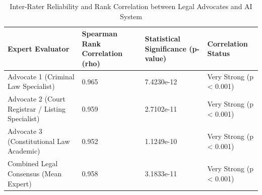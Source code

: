 \begin{table}
\caption{Inter-Rater Reliability and Rank Correlation between Legal Advocates and AI System}
\label{tab:expert_agreement}
\begin{tabular}{llll}
\toprule
Expert Evaluator & Spearman Rank Correlation (rho) & Statistical Significance (p-value) & Correlation Status \\
\midrule
Advocate 1 (Criminal Law Specialist) & 0.965 & 7.4230e-12 & Very Strong (p < 0.001) \\
Advocate 2 (Court Registrar / Listing Specialist) & 0.959 & 2.7102e-11 & Very Strong (p < 0.001) \\
Advocate 3 (Constitutional Law Academic) & 0.952 & 1.1249e-10 & Very Strong (p < 0.001) \\
Combined Legal Consensus (Mean Expert) & 0.958 & 3.1833e-11 & Very Strong (p < 0.001) \\
\bottomrule
\end{tabular}
\end{table}
